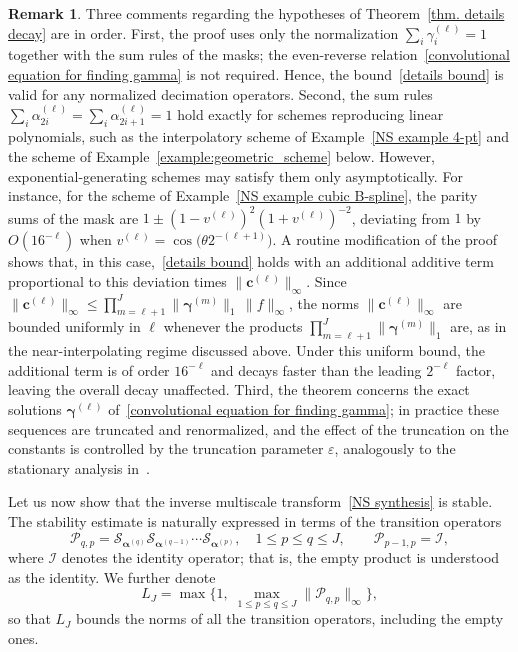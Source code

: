 \documentclass[11pt,a4paper]{article}
\theoremstyle{definition}
\newtheorem{remark}[theorem]{Remark}
\begin{document}
\begin{remark} \label{rem:hypotheses}
Three comments regarding the hypotheses of Theorem~\ref{thm. details decay} are in order. First, the proof uses only the normalization $\sum_i \gamma^{(\ell)}_i=1$ together with the sum rules of the masks; the even-reverse relation~\eqref{convolutional equation for finding gamma} is not required. Hence, the bound~\eqref{details bound} is valid for any normalized decimation operators. Second, the sum rules $\sum_{i}\alpha^{(\ell)}_{2i}=\sum_{i}\alpha^{(\ell)}_{2i+1}=1$ hold exactly for schemes reproducing linear polynomials, such as the interpolatory scheme of Example~\ref{NS example 4-pt} and the scheme of Example~\ref{example:geometric_scheme} below. However, exponential-generating schemes may satisfy them only asymptotically. For instance, for the scheme of Example~\ref{NS example cubic B-spline}, the parity sums of the mask are $1\pm(1-v^{(\ell)})^2(1+v^{(\ell)})^{-2}$, deviating from $1$ by $O(16^{-\ell})$ when $v^{(\ell)}=\cos\big(\theta 2^{-(\ell+1)}\big)$. A routine modification of the proof shows that, in this case,~\eqref{details bound} holds with an additional additive term proportional to this deviation times $\|\boldsymbol{c}^{(\ell)}\|_\infty$. Since $\|\boldsymbol{c}^{(\ell)}\|_\infty\leq\prod_{m=\ell+1}^{J}\|\boldsymbol{\gamma}^{(m)}\|_1\,\|f\|_\infty$, the norms $\|\boldsymbol{c}^{(\ell)}\|_\infty$ are bounded uniformly in $\ell$ whenever the products $\prod_{m=\ell+1}^{J}\|\boldsymbol{\gamma}^{(m)}\|_1$ are, as in the near-interpolating regime discussed above. Under this uniform bound, the additional term is of order $16^{-\ell}$ and decays faster than the leading $2^{-\ell}$ factor, leaving the overall decay unaffected. Third, the theorem concerns the exact solutions $\boldsymbol{\gamma}^{(\ell)}$ of~\eqref{convolutional equation for finding gamma}; in practice these sequences are truncated and renormalized, and the effect of the truncation on the constants is controlled by the truncation parameter $\varepsilon$, analogously to the stationary analysis in~\cite{mattar2023pyramid}.
\end{remark}

Let us now show that the inverse multiscale transform~\eqref{NS synthesis} is stable. The stability estimate is naturally expressed in terms of the transition operators
\begin{equation}\label{eqn:transition_operators}
    \mathcal{P}_{q,p}=\mathcal{S}_{\boldsymbol{\alpha}^{(q)}}\mathcal{S}_{\boldsymbol{\alpha}^{(q-1)}}\cdots\mathcal{S}_{\boldsymbol{\alpha}^{(p)}}, \quad 1\leq p\leq q\leq J, \qquad \mathcal{P}_{p-1,p}=\mathcal{I},
\end{equation}
where $\mathcal{I}$ denotes the identity operator; that is, the empty product is understood as the identity. We further denote
\begin{equation}\label{eqn:LJ}
    L_J=\max\Big\{1,\; \max_{1\leq p\leq q\leq J}\|\mathcal{P}_{q,p}\|_\infty\Big\},
\end{equation}
so that $L_J$ bounds the norms of all the transition operators, including the empty ones.
\end{document}
